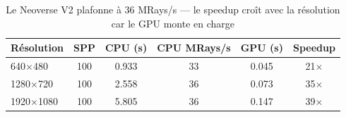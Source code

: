 \documentclass[12pt,a4paper]{article}
\begin{document}
\begin{table}[H]
\centering
\caption{Le Neoverse V2 plafonne \`{a} 36 MRays/s --- le speedup cro\^{i}t avec la r\'{e}solution car le GPU monte en charge}
\begin{tabular}{lccccc}
\toprule
\textbf{R\'{e}solution} & \textbf{SPP} & \textbf{CPU (s)} & \textbf{CPU MRays/s} & \textbf{GPU (s)} & \textbf{Speedup} \\
\midrule
640$\times$480 & 100 & 0.933 & 33 & 0.045 & 21$\times$ \\
1280$\times$720 & 100 & 2.558 & 36 & 0.073 & 35$\times$ \\
1920$\times$1080 & 100 & 5.805 & 36 & 0.147 & 39$\times$ \\
\bottomrule
\end{tabular}
\label{tab:benchmarks_romeo_cpu}
\end{table}
\end{document}
